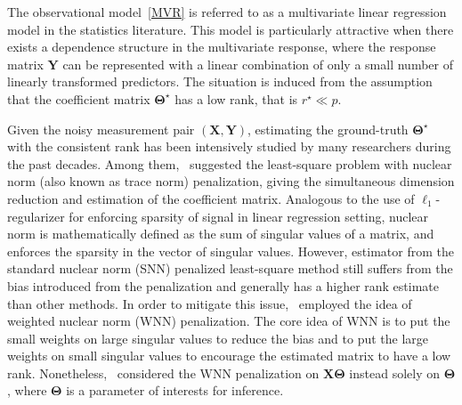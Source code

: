\documentclass[alpha-refs]{wiley-article}
\begin{document}
The observational model~\eqref{MVR} is referred to as a multivariate linear regression model in the statistics literature.
This model is particularly attractive when there exists a dependence structure in the multivariate response, where the response matrix $\boldsymbol{Y}$ can be represented with a linear combination of only a small number of linearly transformed predictors.
The situation is induced from the assumption that the coefficient matrix $\boldsymbol{\Theta}^{\star}$ has a low rank, that is $r^{\star} \ll p$.

Given the noisy measurement pair $(\boldsymbol{X},\boldsymbol{Y})$, estimating the ground-truth $\boldsymbol{\Theta}^{\star}$ with the consistent rank has been intensively studied by many researchers during the past decades.
Among them,~\citet{yuan2007dimension} suggested the least-square problem with nuclear norm (also known as trace norm) penalization, giving the simultaneous dimension reduction and estimation of the coefficient matrix.
Analogous to the use of $\ell_{1}$-regularizer for enforcing sparsity of signal in linear regression setting,
nuclear norm is mathematically defined as the sum of singular values of a matrix, and enforces the sparsity in the vector of singular values.
However, estimator from the standard nuclear norm (SNN) penalized least-square method still suffers from the bias introduced from the penalization and generally has a higher rank estimate than other methods.
In order to mitigate this issue,~\citet{chen2013reduced} employed the idea of weighted nuclear norm (WNN) penalization.
The core idea of WNN is to put the small weights on large singular values to reduce the bias and to put the large weights on small singular values to encourage the estimated matrix to have a low rank.
Nonetheless,~\citet{chen2013reduced} considered the WNN penalization on $\boldsymbol{X\Theta}$ instead solely on $\boldsymbol{\Theta}$, where $\boldsymbol{\Theta}$ is a parameter of interests for inference.
\end{document}
